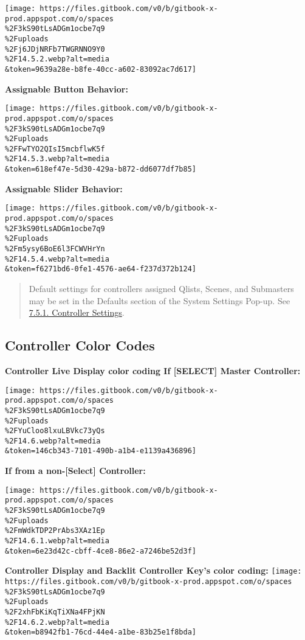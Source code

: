 \documentclass[
]{article}
\begin{document}
\texttt{[image: https://files.gitbook.com/v0/b/gitbook-x-prod.appspot.com/o/spaces\\\%2F3kS90tLsADGm1ocbe7q9\\\%2Fuploads\\\%2Fj6JDjNRFb7TWGRNNO9Y0\\\%2F14.5.2.webp?alt=media\\\&token=9639a28e-b8fe-40cc-a602-83092ac7d617]}

\textbf{Assignable Button Behavior:}

\texttt{[image: https://files.gitbook.com/v0/b/gitbook-x-prod.appspot.com/o/spaces\\\%2F3kS90tLsADGm1ocbe7q9\\\%2Fuploads\\\%2FFwTYO2QIsI5mcbflwK5f\\\%2F14.5.3.webp?alt=media\\\&token=618ef47e-5d30-429a-b872-dd6077df7b85]}

\textbf{Assignable Slider Behavior:}

\texttt{[image: https://files.gitbook.com/v0/b/gitbook-x-prod.appspot.com/o/spaces\\\%2F3kS90tLsADGm1ocbe7q9\\\%2Fuploads\\\%2Fm5ysy6BoE6l3FCWVHrYn\\\%2F14.5.4.webp?alt=media\\\&token=f6271bd6-0fe1-4576-ae64-f237d372b124]}

\begin{quote}
Default settings for controllers assigned Qlists, Scenes, and Submasters may be set in the Defaults section of the System Settings Pop-up. See \href{https://vibemanual.compulite.com/system-default-settings.html\#controller-settings}{7.5.1. Controller Settings}.
\end{quote}

\hypertarget{controller-color-codes}{%
\subsection{Controller Color Codes}\label{controller-color-codes}}

\textbf{Controller Live Display color coding If {[}SELECT{]} Master Controller:}

\texttt{[image: https://files.gitbook.com/v0/b/gitbook-x-prod.appspot.com/o/spaces\\\%2F3kS90tLsADGm1ocbe7q9\\\%2Fuploads\\\%2FYuCloo8lxuLBVkc73yQs\\\%2F14.6.webp?alt=media\\\&token=146cb343-7101-490b-a1b4-e1139a436896]}

\textbf{If from a non-{[}Select{]} Controller:}

\texttt{[image: https://files.gitbook.com/v0/b/gitbook-x-prod.appspot.com/o/spaces\\\%2F3kS90tLsADGm1ocbe7q9\\\%2Fuploads\\\%2FmWdkTDP2PrAbs3XAz1Ep\\\%2F14.6.1.webp?alt=media\\\&token=6e23d42c-cbff-4ce8-86e2-a7246be52d3f]}

\textbf{Controller Display and Backlit Controller Key's color coding:}
\texttt{[image: https://files.gitbook.com/v0/b/gitbook-x-prod.appspot.com/o/spaces\\\%2F3kS90tLsADGm1ocbe7q9\\\%2Fuploads\\\%2F2xhFbKiKqTiXNa4FPjKN\\\%2F14.6.2.webp?alt=media\\\&token=b8942fb1-76cd-44e4-a1be-83b25e1f8bda]}
\end{document}
